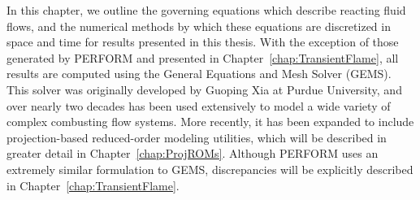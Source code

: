 
In this chapter, we outline the governing equations which describe reacting fluid flows, and the numerical methods by which these equations are discretized in space and time for results presented in this thesis. With the exception of those generated by PERFORM and presented in Chapter~\ref{chap:TransientFlame}, all results are computed using the General Equations and Mesh Solver (GEMS). This solver was originally developed by Guoping Xia at Purdue University, and over nearly two decades has been used extensively to model a wide variety of complex combusting flow systems. More recently, it has been expanded to include projection-based reduced-order modeling utilities, which will be described in greater detail in Chapter~\ref{chap:ProjROMs}. Although PERFORM uses an extremely similar formulation to GEMS, discrepancies will be explicitly described in Chapter~\ref{chap:TransientFlame}.